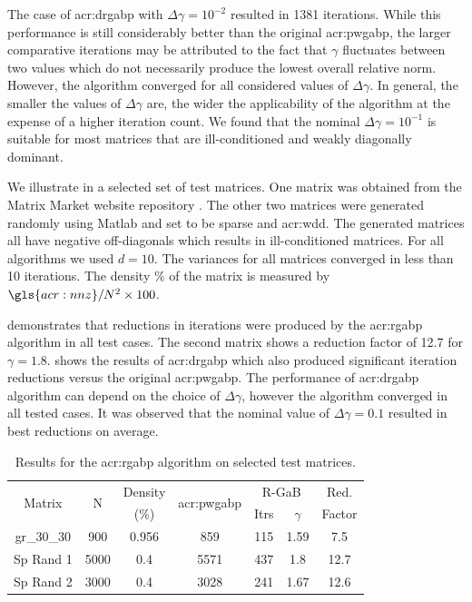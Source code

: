 The case of \gls{acr:drgabp} with $\Delta\gamma = 10^{-2}$ resulted in 1381 iterations.
While this performance is still considerably better than the original \gls{acr:pwgabp}, the larger comparative iterations may be attributed to the fact that $\gamma$ fluctuates between two values which do not necessarily produce the lowest overall relative norm.
However, the algorithm converged for all considered values of $\Delta\gamma$.
In general, the smaller the values of $\Delta\gamma$ are, the wider the applicability of the algorithm at the expense of a higher iteration count.
We found that the nominal $\Delta\gamma = 10^{-1}$ is suitable for most matrices that are ill-conditioned and weakly diagonally dominant.   


We illustrate in  a selected set of test matrices.
One matrix was obtained from the Matrix Market website repository \cite{bib:matrixMarket}.
The other two matrices were generated randomly using Matlab and set to be sparse and \gls{acr:wdd}.
The generated matrices all have negative off-diagonals which results in ill-conditioned matrices.
For all algorithms we used $d = 10$.
The variances for all matrices converged in less than 10 iterations.
The density \% of the matrix is measured by $\gls{acr:nnz} / N^2 \times 100$.

 demonstrates that reductions in iterations were produced by the \gls{acr:rgabp} algorithm in all test cases.
The second matrix shows a reduction factor of 12.7 for $ \gamma = 1.8 $.
 shows the results of \gls{acr:drgabp} which also produced significant iteration reductions versus the original \gls{acr:pwgabp}.
The performance of \gls{acr:drgabp} algorithm can depend on the choice of $\Delta\gamma$, however the algorithm converged in all tested cases.
It was observed that the nominal value of $\Delta\gamma = 0.1$ resulted in best reductions on average.

\begin{table}[h]
	\centering
	\begin{threeparttable}[c]
		\caption{Results for the \acrshort{acr:rgabp} algorithm on selected test matrices.}
		\label{tbl:testmatrices_RGaBP}
		\begin{tabular}{ccccccc}
			\toprule
			\multirow{2}{*}{Matrix} & \multirow{2}{*}{N} & Density & \multirow{2}{*}{\gls{acr:pwgabp}} & \multicolumn{2}{c}{R-GaB} & Red.\tabularnewline
			\cline{5-6} 
			&  & (\%) &  & Itrs & $\gamma$ & Factor\tabularnewline
			\midrule 
			gr\_30\_30 \cite{bib:matrixMarket} & 900 & 0.956 & 859 & 115 & 1.59 & 7.5\tabularnewline
			Sp Rand 1 & 5000 & 0.4 & 5571 & 437 & 1.8 & 12.7\tabularnewline
			Sp Rand 2 & 3000 & 0.4 & 3028 & 241 & 1.67 & 12.6\tabularnewline
			\bottomrule
		\end{tabular}
	\end{threeparttable}
\end{table}



